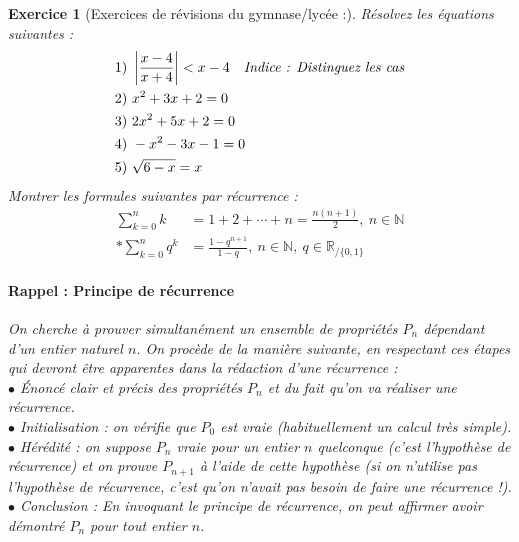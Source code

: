 \documentclass[11pt,french,table]{article}
\theoremstyle{exercice}
\newtheorem{exercice}{Exercice}
\begin{document}
\begin{exercice}[Exercices de révisions du gymnase/lycée :]
Résolvez les équations suivantes : 
\begin{align*}
1)& \ \displaystyle\left\lvert\frac{x-4}{x+4} \right\rvert < x-4 \ \ \text{ \textit{Indice : Distinguez les cas}}\\
2)& \ x^2+3x+2=0 \\
3)& \ 2x^2+5x+2=0 \\
4)& \ -x^2-3x-1=0\\
5)& \ \sqrt{6-x}=x
\end{align*}
Montrer les formules suivantes par récurrence : 
\begin{align*}
    \sum_{k=0}^n k &= 1+2+\cdots+n= \frac{n(n+1)}{2}, \ n \in \mathbb{N}\\
    * \sum_{k=0}^n q^k &= \frac{1-q^{n+1}}{1-q}, \ n \in \mathbb{N}, \ q \in \mathbb{R}_{/ \{0,1\}}
\end{align*} 
\paragraph{Rappel : Principe de récurrence}
       On cherche à prouver simultanément un ensemble de
propriétés $P_n$ dépendant d’un entier naturel $n$. On procède de la manière suivante, en respectant ces étapes qui devront être apparentes dans la rédaction d'une récurrence : \\
$\bullet$ Énoncé clair et précis des propriétés $P_n$ et du fait qu’on va réaliser une récurrence. \\
$\bullet$ Initialisation : on vérifie que $P_0$ est vraie (habituellement un calcul très simple). \\
$\bullet$ Hérédité : on suppose $P_n$ vraie pour un entier $n$ quelconque (c’est l’hypothèse de récurrence)
et on prouve $P_{n+1}$ à l’aide de cette hypothèse (si on n’utilise pas l’hypothèse de récurrence, c’est qu’on n’avait pas besoin de faire une récurrence !).\\
$\bullet$ Conclusion : En invoquant le principe de récurrence, on peut affirmer avoir démontré $P_n$ pour tout entier $n$.
\end{exercice}
\end{document}
